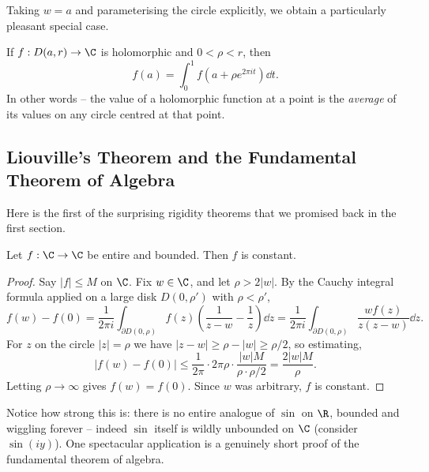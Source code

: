 Taking $w = a$ and parameterising the circle explicitly, we obtain a particularly pleasant special case.

\begin{corollary}
    If $f: D(a, r) \rightarrow \C$ is holomorphic and $0 < \rho < r$, then
    $$
    f(a) = \int_0^1 f(a + \rho e^{2 \pi i t}) \dd t.
    $$
    In other words -- the value of a holomorphic function at a point is the \emph{average} of its values on any circle centred at that point.
\end{corollary}

\subsection{Liouville's Theorem and the Fundamental Theorem of Algebra}

Here is the first of the surprising rigidity theorems that we promised back in the first section.

\begin{theorem}
    Let $f: \C \rightarrow \C$ be entire and bounded. Then $f$ is constant.
\end{theorem}
\begin{proof}
    Say $|f| \leq M$ on $\C$. Fix $w \in \C$, and let $\rho > 2|w|$. By the Cauchy integral formula applied on a large disk $D(0, \rho')$ with $\rho < \rho'$,
    $$
    f(w) - f(0) = \frac{1}{2 \pi i} \int_{\partial D(0, \rho)} f(z)\left(\frac{1}{z - w} - \frac{1}{z}\right) \dd z = \frac{1}{2\pi i} \int_{\partial D(0, \rho)} \frac{w f(z)}{z(z - w)} \dd z.
    $$
    For $z$ on the circle $|z| = \rho$ we have $|z - w| \geq \rho - |w| \geq \rho/2$, so estimating,
    $$
    |f(w) - f(0)| \leq \frac{1}{2 \pi} \cdot 2 \pi \rho \cdot \frac{|w| M}{\rho \cdot \rho/2} = \frac{2|w| M}{\rho}.
    $$
    Letting $\rho \rightarrow \infty$ gives $f(w) = f(0)$. Since $w$ was arbitrary, $f$ is constant.
\end{proof}

Notice how strong this is: there is no entire analogue of $\sin$ on $\R$, bounded and wiggling forever -- indeed $\sin$ itself is wildly unbounded on $\C$ (consider $\sin(iy)$). One spectacular application is a genuinely short proof of the fundamental theorem of algebra.

